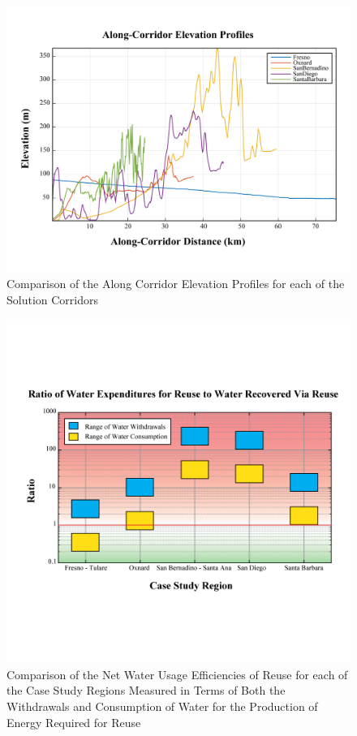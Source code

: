     \begin{figure}[!h]
        \begin{center}
        \includegraphics[width=5.5in]{figures/ElevationProfiles.png}
        \caption{Comparison of the Along Corridor Elevation Profiles for each of the Solution Corridors}
        \label{fig:ElevationProfiles}
        \end{center}
    \end{figure}
    
    \begin{figure}[!h]
        \begin{center}
        \includegraphics[width=5.5in]{figures/Efficiencies.png}
        \caption{Comparison of the Net Water Usage Efficiencies of Reuse for each of the Case Study Regions Measured in Terms of Both the Withdrawals and Consumption of Water for the Production of Energy Required for Reuse}
        \label{fig:Efficiences}
        \end{center}
    \end{figure}